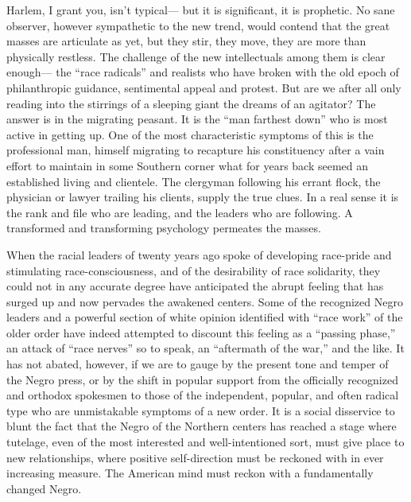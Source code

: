 \documentclass[12pt]{article}
\begin{document}
Harlem, I grant you, isn't typical--- but it is significant, it is prophetic. No sane observer, however sympathetic to the new trend, would contend that the great masses are articulate as yet, but they stir, they move, they are more than physically restless. The challenge of the new intellectuals among them is clear enough--- the ``race radicals'' and realists who have broken with the old epoch of philanthropic guidance, sentimental appeal and protest. But are we after all only reading into the stirrings of a sleeping giant the dreams of an agitator? The answer is in the migrating peasant. It is the ``man farthest down'' who is most active in getting up. One of the most characteristic symptoms of this is the professional man, himself migrating to recapture his constituency after a vain effort to maintain in some Southern corner what for years back seemed an established living and clientele. The clergyman following his errant flock, the physician or lawyer trailing his clients, supply the true clues. In a real sense it is the rank and file who are leading, and the leaders who are following. A transformed and transforming psychology permeates the masses.

When the racial leaders of twenty years ago spoke of developing race-pride and stimulating race-consciousness, and of the desirability of race solidarity, they could not in any accurate degree have anticipated the abrupt feeling that has surged up and now pervades the awakened centers. Some of the recognized Negro leaders and a powerful section of white opinion identified with ``race work'' of the older order have indeed attempted to discount this feeling as a ``passing phase,'' an attack of ``race nerves'' so to speak, an ``aftermath of the war,'' and the like. It has not abated, however, if we are to gauge by the present tone and temper of the Negro press, or by the shift in popular support from the officially recognized and orthodox spokesmen to those of the independent, popular, and often radical type who are unmistakable symptoms of a new order. It is a social disservice to blunt the fact that the Negro of the Northern centers has reached a stage where tutelage, even of the most interested and well-intentioned sort, must give place to new relationships, where positive self-direction must be reckoned with in ever increasing measure. The American mind must reckon with a fundamentally changed Negro.
\end{document}
